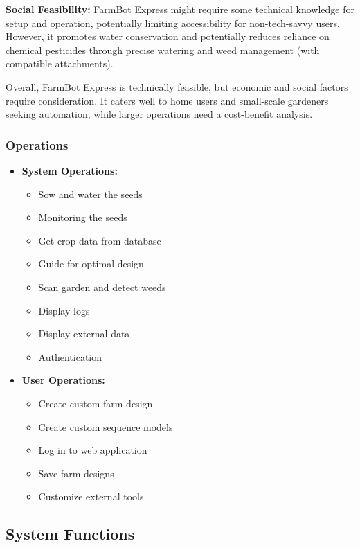 \textbf{Social Feasibility:}  FarmBot Express might require some technical knowledge for setup and operation, potentially limiting accessibility for non-tech-savvy users. However, it promotes water conservation and potentially reduces reliance on chemical pesticides through precise watering and weed management (with compatible attachments).

Overall, FarmBot Express is technically feasible, but economic and social factors require consideration. It caters well to home users and small-scale gardeners seeking automation, while larger operations need a cost-benefit analysis.


\subsubsection{Operations}

\begin{itemize}
    \item \textbf{System Operations:}
        \begin{itemize}
            \item Sow and water the seeds
            \item Monitoring the seeds
            \item Get crop data from database
            \item Guide for optimal design
            \item Scan garden and detect weeds
            \item Display logs
            \item Display external data
            \item Authentication
        \end{itemize}
    \item \textbf{User Operations:}
        \begin{itemize}
            \item Create custom farm design
            \item Create custom sequence models
            \item Log in to web application
            \item Save farm designs
            \item Customize external tools
        \end{itemize}
\end{itemize}

\subsection{System Functions}

